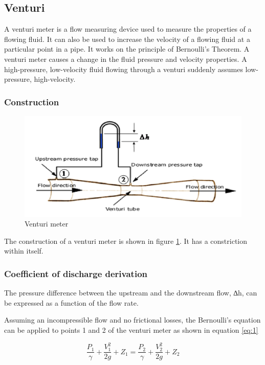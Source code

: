 \subsection{Venturi}

A venturi meter is a flow measuring device used to measure the properties of a flowing fluid. It can also be used to increase the velocity of a flowing fluid at a particular point in a pipe. It works on the principle of Bernoulli’s Theorem\cite{pockman1940bernoulli}. A venturi meter causes a change in the fluid pressure and velocity properties\cite{hutagalung2019estimation}. A high-pressure, low-velocity fluid flowing through a venturi suddenly assumes low-pressure, high-velocity.

\subsubsection{Construction}

\begin{figure}[ht]
\includegraphics[width=0.9\linewidth]{Figures/venturi.png}
\centering
\caption{Venturi meter}
\label{fig:venturi}
\end{figure}

The construction of a venturi meter is shown in figure \ref{fig:venturi}. It has a constriction within itself.

\subsubsection{Coefficient of discharge derivation}

The pressure difference between the upstream and the downstream flow, ∆h, can be expressed as a function of the flow rate.
\par
Assuming an incompressible flow and no frictional losses, the Bernoulli’s equation can be applied to points 1 and 2 of the venturi meter as shown in equation \ref{eq:1} 

\begin{equation}
\label{eq:1}
\frac{P_{1}}{\gamma}+\frac{V_{1}^{2}}{2 g}+Z_{1}=\frac{P_{2}}{\gamma}+\frac{V_{2}^{2}}{2 g}+Z_{2}
\end{equation}


